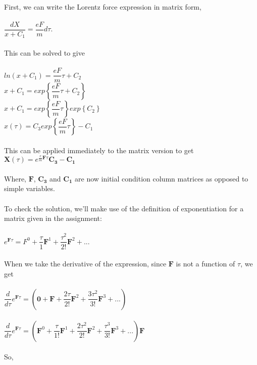 \documentclass[prb,preprint]
{revtex4-1}
\begin{document}
\\
First, we can write the Lorentz force expression in matrix form,
\\
\\
$\dfrac{dX}{x+C_1} = \dfrac{e F}{m} d\tau$.
\\
\\
This can be solved to give
\\
\\
$ln\left(x+C_1\right) = \dfrac{e F}{m} \tau + C_2$
\\
$x + C_1 = exp\left\{\dfrac{e F}{m} \tau + C_2\right\}$
\\
$x + C_1 = exp\left\{\dfrac{e F}{m} \tau\right\}exp\left\{C_2\right\}$
\\
$x\left(\tau\right) = C_3 exp\left\{\dfrac{e F}{m} \tau\right\} - C_1$
\\
\\
This can be applied immediately to the matrix version to get 
\\
$\boldsymbol{X}\left(\tau\right) = e^{\frac{e}{m}\boldsymbol{F}\tau}\boldsymbol{C_3}  - \boldsymbol{C_1}$
\\
\\
Where, $\boldsymbol{F}$, $\boldsymbol{C_3}$ and $\boldsymbol{C_1}$ are now initial condition column matrices as opposed to simple variables.  
\\
\\
To check the solution, we'll make use of the definition of exponentiation for a matrix given in the assignment:
\\
\\
$e^{\boldsymbol{F}\tau} = F^0 + \dfrac{\tau}{1}\boldsymbol{F}^1 + \dfrac{\tau^2}{2!}\boldsymbol{F}^2 + ...$
\\
\\
When we take the derivative of the expression, since $\boldsymbol{F}$ is not a function of $\tau$, we get
\\
\\
$\dfrac{d}{d\tau} e^{\boldsymbol{F}\tau} = \left(\boldsymbol{0} + \boldsymbol{F} + \dfrac{2\tau}{2!}\boldsymbol{F}^2 + \dfrac{3\tau^2}{3!}\boldsymbol{F}^3 + ...\right)$
\\
\\
$\dfrac{d}{d\tau} e^{\boldsymbol{F}\tau} = \left(\boldsymbol{F}^0 + \dfrac{\tau}{1!}\boldsymbol{F}^1 + \dfrac{2\tau^2}{2!}\boldsymbol{F}^2 + \dfrac{\tau^3}{3!}\boldsymbol{F}^3 + ...\right)\boldsymbol{F}$
\\
\\
So, 
\\
\end{document}
